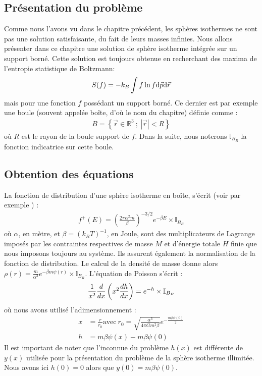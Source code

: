 \subsection{Présentation du problème}
	Comme nous l'avons vu dans le chapitre précédent, les sphères isothermes ne sont pas une solution satisfaisante, du fait de leurs masses infinies.
	Nous allons présenter dans ce chapitre une solution de sphère isotherme intégrée sur un support borné. Cette solution est toujours obtenue en recherchant des maxima  de l'entropie statistique de Boltzmann:
	\begin{align*}
		S(f) = - k_B \int f \ln f \mathrm{d}\vec{p}\mathrm{d}\vec{r}
	\end{align*}
	mais pour une fonction $f$ possédant un support borné. Ce dernier est par exemple une boule (souvent appelée boîte, d'où le nom du chapitre) définie comme :
	\begin{align}
		B = \left\{ \vec{r} \in \mathbb{R}^3\ ;\ \left|\vec{r}\right| < R\right\}
	\end{align}
	où $R$ est le rayon de la boule support de $f$. Dans la suite, nous noterons $\mathbb{I}_{B_R}$ la fonction indicatrice sur cette boule.

\subsection{Obtention des équations}
	La fonction de distribution d'une sphère isotherme en boîte, s'écrit (voir par exemple \cite{CoursJP}) :
	\begin{align}
		f^+(E) = \left(\frac{2\pi\alpha^2m}{\beta}\right)^{-3/2}e^{-\beta E}\times\mathbb{I}_{B_R}
	\end{align}
	où $\alpha$, en mètre, et $\beta=(k_B T)^{-1}$, en Joule, sont des multiplicateurs de Lagrange imposés
	par les contraintes respectives de masse $M$ et d'énergie totale $H$ finie que nous imposons toujours au système.
	Ils assurent également la normalisation de la fonction de distribution.
	Le calcul de la densité de masse donne alors \mbox{$\rho(r) = \frac{m}{\alpha^3}e^{-\beta m \psi(r)}\times\mathbb{I}_{B_R}$}. %
	L'équation de Poisson s'écrit :
	\begin{align}
		 \frac{1}{x^2}\frac{d}{dx}\left(x^2\frac{d h}{dx}\right) = e^{-h} \times\mathbb{I}_{B_R} \notag
	\end{align}
	où nous avons utilisé l'adimensionnement  :
	\begin{align}
		x &= \frac{r}{r_0}\mathrm{ avec }\ r_0 = \sqrt{\frac{\alpha^3}{4\pi G m^2\beta}}e^{-\frac{m\beta\psi(0)}{2}} \label{toto11} \\
		h &= m\beta\psi(x) - m\beta\psi(0) \label{toto12}
		\end{align}
		Il est important de noter que l'inconnue du problème $h(x)$ est différente de $y(x)$ utilisée pour la présentation du problème de la sphère isotherme illimitée. Nous avons ici $h(0) = 0$ alors que $y(0) = m\beta\psi(0)$.
		
